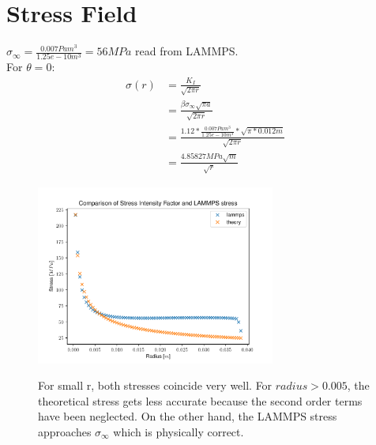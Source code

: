 \section{Stress Field}
$\sigma_\infty=\frac{0.007Pam^3}{1.25e-10m^3}=56MPa$ read from LAMMPS.\\
For $\theta = 0$:
\begin{align}
	\sigma(r) &= \frac{K_I}{\sqrt{2\pi r}}\\
	&=\frac{\beta \sigma_\infty\sqrt{\pi a}}{\sqrt{2\pi r}}\\
	&=\frac{1.12*\frac{0.007Pam^3}{1.25e-10m^3}*\sqrt{\pi*0.012m}}{\sqrt{2\pi r}}\\
	&=\frac{4.85827MPa\sqrt{m}}{\sqrt{r}}
\end{align}

\begin{figure}[hbtp]
	\centering
	\includegraphics[width=0.7\textwidth]{Skripte/stressComparison}
	\label{fig:stressComparison}
	\caption{For small r, both stresses coincide very well. For $radius>0.005$, the theoretical stress gets less accurate because the second order terms have been neglected. On the other hand, the LAMMPS stress approaches $\sigma_\infty$ which is physically correct.}
\end{figure}